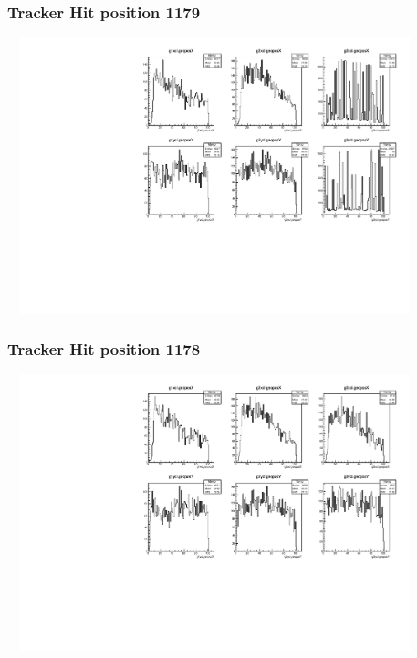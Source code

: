 \documentclass[slidestop,compress,mathserif]{beamer}
\begin{document}
\begin{frame}\frametitle{Tracker Hit position 1179}
	 \includegraphics[width=12cm,height=8cm]{Tracker_Hit_position_1179.pdf}
\end{frame}
\begin{frame}\frametitle{Tracker Hit position 1178}
	 \includegraphics[width=12cm,height=8cm]{Tracker_Hit_position_1178.pdf}
\end{frame}
\end{document}
